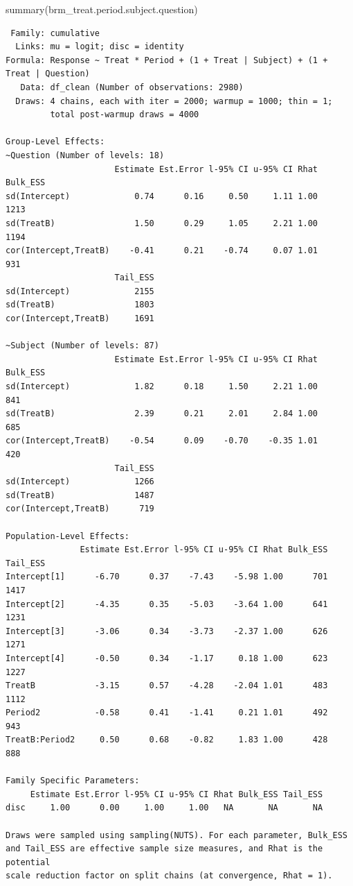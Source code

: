 \documentclass[
  12pt,
  a4paper,
  extrafontsizes,
  onecolumn,
  openright]{memoir}
\newenvironment{Shaded}{\begin{snugshade}}{\end{snugshade}}
\newcommand{\FunctionTok}[1]{\textcolor[rgb]{0.28,0.35,0.67}{#1}}
\newcommand{\NormalTok}[1]{\textcolor[rgb]{0.00,0.23,0.31}{#1}}
\begin{document}
\scriptsize

\begin{Shaded}
\begin{Highlighting}[]
\FunctionTok{summary}\NormalTok{(brm\_treat.period.subject.question)}
\end{Highlighting}
\end{Shaded}

\begin{verbatim}
 Family: cumulative 
  Links: mu = logit; disc = identity 
Formula: Response ~ Treat * Period + (1 + Treat | Subject) + (1 + Treat | Question) 
   Data: df_clean (Number of observations: 2980) 
  Draws: 4 chains, each with iter = 2000; warmup = 1000; thin = 1;
         total post-warmup draws = 4000

Group-Level Effects: 
~Question (Number of levels: 18) 
                      Estimate Est.Error l-95% CI u-95% CI Rhat Bulk_ESS
sd(Intercept)             0.74      0.16     0.50     1.11 1.00     1213
sd(TreatB)                1.50      0.29     1.05     2.21 1.00     1194
cor(Intercept,TreatB)    -0.41      0.21    -0.74     0.07 1.01      931
                      Tail_ESS
sd(Intercept)             2155
sd(TreatB)                1803
cor(Intercept,TreatB)     1691

~Subject (Number of levels: 87) 
                      Estimate Est.Error l-95% CI u-95% CI Rhat Bulk_ESS
sd(Intercept)             1.82      0.18     1.50     2.21 1.00      841
sd(TreatB)                2.39      0.21     2.01     2.84 1.00      685
cor(Intercept,TreatB)    -0.54      0.09    -0.70    -0.35 1.01      420
                      Tail_ESS
sd(Intercept)             1266
sd(TreatB)                1487
cor(Intercept,TreatB)      719

Population-Level Effects: 
               Estimate Est.Error l-95% CI u-95% CI Rhat Bulk_ESS Tail_ESS
Intercept[1]      -6.70      0.37    -7.43    -5.98 1.00      701     1417
Intercept[2]      -4.35      0.35    -5.03    -3.64 1.00      641     1231
Intercept[3]      -3.06      0.34    -3.73    -2.37 1.00      626     1271
Intercept[4]      -0.50      0.34    -1.17     0.18 1.00      623     1227
TreatB            -3.15      0.57    -4.28    -2.04 1.01      483     1112
Period2           -0.58      0.41    -1.41     0.21 1.01      492      943
TreatB:Period2     0.50      0.68    -0.82     1.83 1.00      428      888

Family Specific Parameters: 
     Estimate Est.Error l-95% CI u-95% CI Rhat Bulk_ESS Tail_ESS
disc     1.00      0.00     1.00     1.00   NA       NA       NA

Draws were sampled using sampling(NUTS). For each parameter, Bulk_ESS
and Tail_ESS are effective sample size measures, and Rhat is the potential
scale reduction factor on split chains (at convergence, Rhat = 1).
\end{verbatim}
\end{document}
